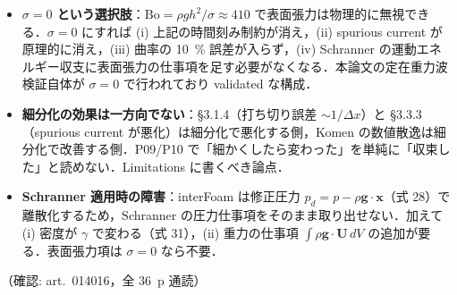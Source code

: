\documentclass[11pt]{jsarticle}
\begin{document}
\begin{itemize}
\begin{itemize}
    \item \textbf{$\sigma = 0$ という選択肢}：$\mathrm{Bo} = \rho g h^2/\sigma \approx 410$ で表面張力は物理的に無視できる．$\sigma = 0$ にすれば (i) 上記の時間刻み制約が消え，(ii) spurious current が原理的に消え，(iii) 曲率の 10~\% 誤差が入らず，(iv) Schranner の運動エネルギー収支に表面張力の仕事項を足す必要がなくなる．本論文の定在重力波検証自体が $\sigma = 0$ で行われており validated な構成．
    \item \textbf{細分化の効果は一方向でない}：§3.1.4（打ち切り誤差 $\sim 1/\Delta x$）と §3.3.3（spurious current が悪化）は細分化で悪化する側，Komen の数値散逸は細分化で改善する側．P09/P10 で「細かくしたら変わった」を単純に「収束した」と読めない．Limitations に書くべき論点．
    \item \textbf{Schranner 適用時の障害}：interFoam は修正圧力 $p_d = p - \rho\mathbf{g}\cdot\mathbf{x}$（式 28）で離散化するため，Schranner の圧力仕事項をそのまま取り出せない．加えて (i) 密度が $\gamma$ で変わる（式 31），(ii) 重力の仕事項 $\int \rho\mathbf{g}\cdot\mathbf{U}\,dV$ の追加が要る．表面張力項は $\sigma = 0$ なら不要．
  \end{itemize}
\end{itemize}
\noindent（確認: art.\ 014016，全 36~p 通読）
\end{document}
